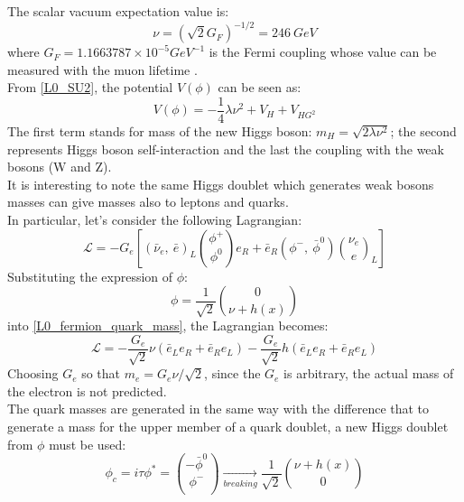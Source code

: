 The scalar vacuum expectation value is:
\begin{equation}
\nu=(\sqrt{2}G_{F})^{-1/2}=246\ GeV
\end{equation}
where $G_{F} = 1.1663787 \times 10^{-5} GeV^{-1}$ is the Fermi coupling whose value can be measured with the muon lifetime \cite{muLifetime}.\\
From \ref{L0_SU2}, the potential $V(\phi)$ can be seen as:
\begin{equation}
V(\phi)=-\frac{1}{4}\lambda\nu^{2}+V_{H}+V_{HG^{2}}
\label{V0_Higgs}
\end{equation}
The first term stands for mass of the new Higgs boson: $m_{H} = \sqrt{2\lambda\nu^{2}}$; the second represents Higgs boson self-interaction and the last the coupling with the weak bosons (W and Z). \\
It is interesting to note the same Higgs doublet which generates weak bosons masses can give masses also to leptons and quarks. \\
In particular, let's consider the following Lagrangian:
\begin{equation}
\mathcal{L} = -G_{e} [(\bar{\nu}_{e},\ \bar{e})_{L}{\phi^{+} \choose \phi^{0}}e_{R}+\bar{e}_{R}(\phi^{-},\ \bar{\phi}^{0}){\nu_{e} \choose e}_{L} ]
\label{L0_fermion_quark_mass}
\end{equation}
Substituting the expression of $\phi$:
\begin{equation}
\phi = \frac{1}{\sqrt{2}}{0 \choose \nu+h(x)}
\end{equation}
into \ref{L0_fermion_quark_mass}, the Lagrangian becomes:
\begin{equation}
\mathcal{L} = -\frac{G_{e}}{\sqrt{2}}\nu(\bar{e}_{L}e_{R}+\bar{e}_{R}e_{L})-\frac{G_{e}}{\sqrt{2}}h(\bar{e}_{L}e_{R}+\bar{e}_{R}e_{L})
\label{L0_fermion_quark_mass_2}
\end{equation}
Choosing $G_{e}$ so that $m_{e} = G_{e}\nu/\sqrt{2}$, since the $G_{e}$ is arbitrary, the actual mass of the electron is not predicted. \\
The quark masses are generated in the same way with the difference that to generate a mass for the upper member of a quark doublet, a new Higgs doublet from $\phi$ must be used:
\begin{equation}
\phi_{c} = i\tau\phi^{*}={-\bar{\phi}^{0} \choose \phi^{-}} \xrightarrow[breaking]{}\frac{1}{\sqrt{2}}{\nu+h(x) \choose 0}
\end{equation}
